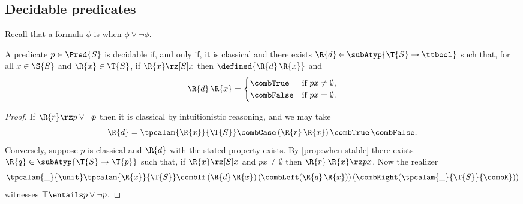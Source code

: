 \subsection{Decidable predicates}
\label{sec:decidable-predicates}

Recall that a formula $\phi$ is  when $\phi \lor \lnot \phi$.

\begin{proposition}
  \label{prop:decidable-when}
  A predicate $p \in \Pred{S}$ is decidable if, and only if, it is classical and there exists
  $\R{d} \in \subAtyp{\T{S} \to \ttbool}$ such that, for all $x \in \S{S}$ and $\R{x} \in \T{S}$, if $\R{x} \rz[S] x$ then $\defined{\R{d}\,\R{x}}$ and
  \begin{equation*}
    \R{d}\,\R{x} =
    \begin{cases}
      \combTrue & \text{if $p x \neq \emptyset$,} \\
      \combFalse & \text{if $p x = \emptyset$.}
    \end{cases}
  \end{equation*}
\end{proposition}

\begin{proof}
  If $\R{r} \rz p \lor \lnot p$ then it is classical by intuitionistic reasoning, and we may take
  \begin{equation*}
    \R{d} = \tpcalam{\R{x}}{\T{S}} \combCase\,(\R{r}\,\R{x})\,\combTrue\,\combFalse.
  \end{equation*}
  Conversely, suppose $p$ is classical and $\R{d}$ with the stated property exists. By \cref{prop:when-stable} there exists $\R{q} \in \subAtyp{\T{S} \to \T{p}}$ such that, if $\R{x} \rz[S] x$ and $p x \neq \emptyset$ then $\R{r}\,\R{x} \rz p x$. Now the realizer
  \begin{equation*}
    \tpcalam{\_}{\unit}
    \tpcalam{\R{x}}{\T{S}}
      \combIf\,
        (\R{d}\,\R{x})\,
        (\combLeft (\R{q}\,\R{x}))\,
        (\combRight (\tpcalam{\_}{\T{S}}{\combK}))
  \end{equation*}
  witnesses $\top \entails p \lor \lnot p$.
\end{proof}

